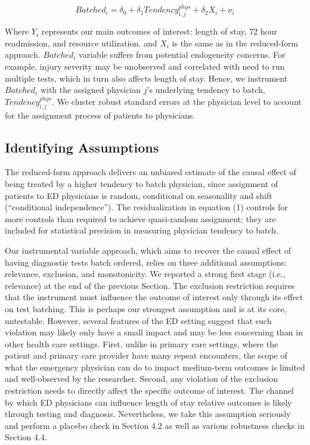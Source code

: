 \documentclass[,,nonblindrev]{informs}
\begin{document}
\begin{equation}
Batched_i = \delta_0 + \delta_1 Tendency_{i,j}^{phys} + \delta_2 X_i + \nu_i
\end{equation}

Where \(Y_i\) represents our main outcomes of interest: length of stay,
72 hour readmission, and resource utilization. and \(X_i\) is the same
as in the reduced-form approach. \(Batched_i\) variable suffers from
potential endogeneity concerns. For example, injury severity may be
unobserved and correlated with need to run multiple tests, which in turn
also affects length of stay. Hence, we instrument \(Batched_i\) with the
assigned physician \(j\)'s underlying tendency to batch,
\(Tendency_{i,j}^{phys}\). We cluster robust standard errors at the
physician level to account for the assignment process of patients to
physicians.

\hypertarget{identifying-assumptions}{%
\subsection{Identifying Assumptions}\label{identifying-assumptions}}

The reduced-form approach delivers an unbiased estimate of the causal
effect of being treated by a higher tendency to batch physician, since
assignment of patients to ED physicians is random, conditional on
seasonality and shift (``conditional independence''). The
residualization in equation (1) controls for more controls than required
to achieve quasi-random assignment; they are included for statistical
precision in measuring physician tendency to batch.

Our instrumental variable approach, which aims to recover the causal
effect of having diagnostic tests batch ordered, relies on three
additional assumptions: relevance, exclusion, and monotonicity. We
reported a strong first stage (i.e., relevance) at the end of the
previous Section. The exclusion restriction requires that the instrument
must influence the outcome of interest only through its effect on test
batching. This is perhaps our strongest assumption and is at its core,
untestable. However, several features of the ED setting suggest that
such violation may likely only have a small impact and may be less
concerning than in other health care settings. First, unlike in primary
care settings, where the patient and primary care provider have many
repeat encounters, the scope of what the emergency physician can do to
impact medium-term outcomes is limited and well-observed by the
researcher. Second, any violation of the exclusion restriction needs to
directly affect the specific outcome of interest. The channel by which
ED physicians can influence length of stay relative outcomes is likely
through testing and diagnosis. Nevertheless, we take this assumption
seriously and perform a placebo check in Section 4.2 as well as various
robustness checks in Section 4.4.
\end{document}
